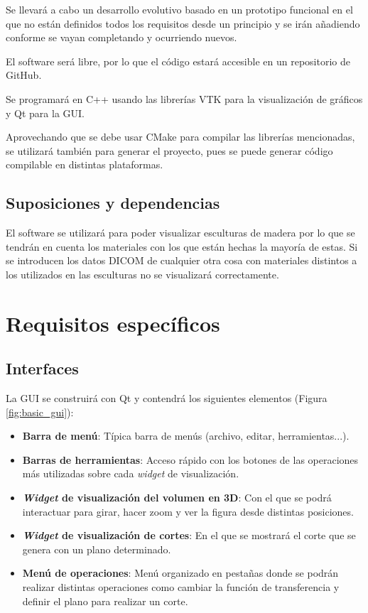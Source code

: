 	Se llevará a cabo un desarrollo evolutivo basado en un prototipo funcional en el que no están definidos todos los requisitos desde un principio y se irán añadiendo conforme se vayan completando y ocurriendo nuevos.
	
	El software será libre, por lo que el código estará accesible en un repositorio de GitHub.
	
	Se programará en C++ usando las librerías VTK para la visualización de gráficos y Qt para la GUI.
	
	Aprovechando que se debe usar CMake para compilar las librerías mencionadas, se utilizará también para generar el proyecto, pues se puede generar código compilable en distintas plataformas.
	
	\subsection{Suposiciones y dependencias}
	
	El software se utilizará para poder visualizar esculturas de madera por lo que se tendrán en cuenta los materiales con los que están hechas la mayoría de estas. Si se introducen los datos DICOM de cualquier otra cosa con materiales distintos a los utilizados en las esculturas no se visualizará correctamente.

\section{Requisitos específicos}

	\subsection{Interfaces}
	
	La GUI se construirá con Qt y contendrá los siguientes elementos (Figura \ref{fig:basic_gui}):
	\begin{itemize}
		\item \textbf{Barra de menú}: Típica barra de menús (archivo, editar, herramientas...).
		\item \textbf{Barras de herramientas}: Acceso rápido con los botones de las operaciones más utilizadas sobre cada \textit{widget} de visualización.
		\item \textbf{\textit{Widget} de visualización del volumen en 3D}: Con el que se podrá interactuar para girar, hacer zoom y ver la figura desde distintas posiciones.
		\item \textbf{\textit{Widget} de visualización de cortes}: En el que se mostrará el corte que se genera con un plano determinado.
		\item \textbf{Menú de operaciones}: Menú organizado en pestañas donde se podrán realizar distintas operaciones como cambiar la función de transferencia y definir el plano para realizar un corte.
	\end{itemize}
	

